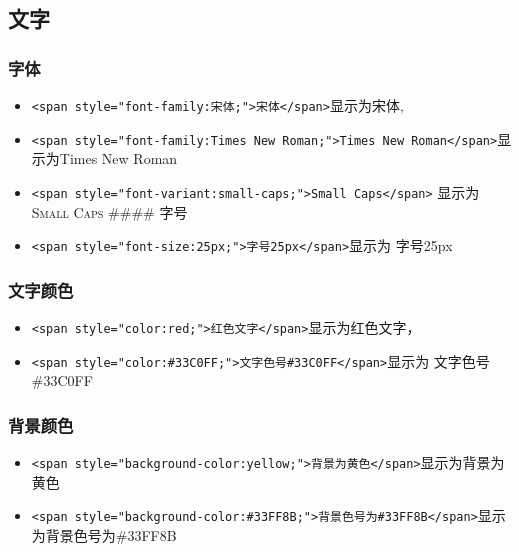 \documentclass[]{ctexbook}
\providecommand{\tightlist}{%
  \setlength{\itemsep}{0pt}\setlength{\parskip}{0pt}}
\begin{document}
\hypertarget{ux6587ux5b57}{%
\subsection{文字}\label{ux6587ux5b57}}

\hypertarget{ux5b57ux4f53}{%
\subsubsection{字体}\label{ux5b57ux4f53}}

\begin{itemize}
\item
  \texttt{\textless{}span\ style="font-family:宋体;"\textgreater{}宋体\textless{}/span\textgreater{}}显示为{宋体},\\
\item
  \texttt{\textless{}span\ style="font-family:Times\ New\ Roman;"\textgreater{}Times\ New\ Roman\textless{}/span\textgreater{}}显示为{Times New
  Roman}
\item
  \texttt{\textless{}span\ style="font-variant:small-caps;"\textgreater{}Small\ Caps\textless{}/span\textgreater{}} 显示为 \textsc{Small Caps}
  \#\#\#\# 字号
\item
  \texttt{\textless{}span\ style="font-size:25px;"\textgreater{}字号25px\textless{}/span\textgreater{}}显示为 {字号25px}
\end{itemize}

\hypertarget{ux6587ux5b57ux989cux8272}{%
\subsubsection{文字颜色}\label{ux6587ux5b57ux989cux8272}}

\begin{itemize}
\tightlist
\item
  \texttt{\textless{}span\ style="color:red;"\textgreater{}红色文字\textless{}/span\textgreater{}}显示为{红色文字}，
\item
  \texttt{\textless{}span\ style="color:\#33C0FF;"\textgreater{}文字色号\#33C0FF\textless{}/span\textgreater{}}显示为 {文字色号\#33C0FF}
\end{itemize}

\hypertarget{ux80ccux666fux989cux8272}{%
\subsubsection{背景颜色}\label{ux80ccux666fux989cux8272}}

\begin{itemize}
\tightlist
\item
  \texttt{\textless{}span\ style="background-color:yellow;"\textgreater{}背景为黄色\textless{}/span\textgreater{}}显示为{背景为黄色}
\item
  \texttt{\textless{}span\ style="background-color:\#33FF8B;"\textgreater{}背景色号为\#33FF8B\textless{}/span\textgreater{}}显示为{背景色号为\#33FF8B}
\end{itemize}
\end{document}
